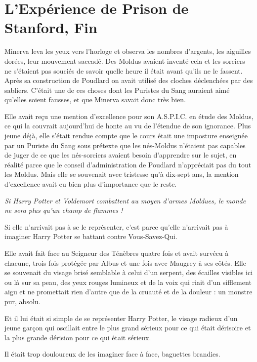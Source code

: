 
\chapter{L'Expérience de Prison de Stanford, Fin}

Minerva leva les yeux vers l'horloge et observa les nombres d'argents, les aiguilles dorées, leur mouvement saccadé. Des Moldus avaient inventé cela et les sorciers ne s'étaient pas souciés de savoir quelle heure il était avant qu'ils ne le fassent. Après sa construction de Poudlard on avait utilisé des cloches déclenchées par des sabliers. C'était une de ces choses dont les Puristes du Sang auraient aimé qu'elles soient fausses, et que Minerva savait donc très bien.

Elle avait reçu une mention d'excellence pour son A.S.P.I.C. en étude des Moldus, ce qui la couvrait aujourd'hui de honte au vu de l'étendue de son ignorance. Plus jeune déjà, elle s'était rendue compte que le cours était une imposture enseignée par un Puriste du Sang sous prétexte que les nés-Moldus n'étaient pas capables de juger de ce que les nés-sorciers avaient besoin d'apprendre sur le sujet, en réalité parce que le conseil d'administration de Poudlard n'appréciait pas du tout les Moldus. Mais elle se souvenait avec tristesse qu'à dix-sept ans, la mention d'excellence avait eu bien plus d'importance que le reste.

\emph{Si Harry Potter et Voldemort combattent au moyen d'armes Moldues, le monde ne sera plus qu'un champ de flammes !} 

Si elle n'arrivait pas à se le représenter, c'est parce qu'elle n'arrivait pas à imaginer Harry Potter se battant contre Vous-Savez-Qui.

Elle avait fait face au Seigneur des Ténèbres quatre fois et avait survécu à chacune, trois fois protégée par Albus et une fois avec Maugrey à ses côtés. Elle se souvenait du visage brisé semblable à celui d'un serpent, des écailles visibles ici ou là sur sa peau, des yeux rouges lumineux et de la voix qui riait d'un sifflement aigu et ne promettait rien d'autre que de la cruauté et de la douleur : un monstre pur, absolu.

Et il lui était si simple de se représenter Harry Potter, le visage radieux d'un jeune garçon qui oscillait entre le plus grand sérieux pour ce qui était dérisoire et la plus grande dérision pour ce qui était sérieux.

Il était trop douloureux de les imaginer face à face, baguettes brandies.

